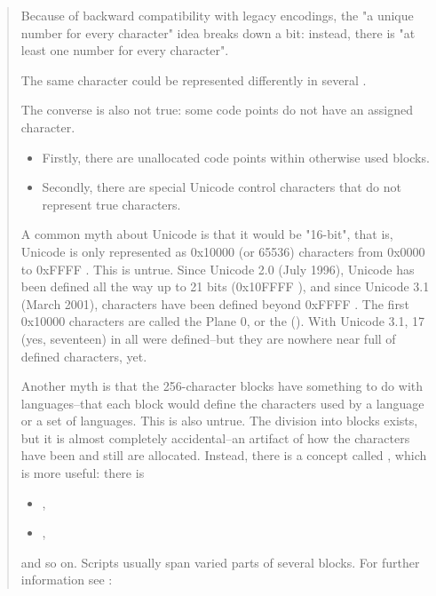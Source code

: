 \begin{htmlonly}
\begin{it}
\begin{quote}
Because of backward compatibility with legacy encodings, the "a unique
number for every character" idea breaks down a bit: instead, there is
"at least one number for every character". 

The same character could be
represented differently in several . 

The converse is also
not true: some code points do not have an assigned character. 

\begin{itemize}
\item
Firstly,
there are unallocated code points within otherwise used blocks.
\item Secondly,
there are special Unicode control characters that do not represent
true characters.
\end{itemize}

A common myth about Unicode is that it would be "16-bit", that is,
Unicode is only represented as 0x10000 (or 65536) characters from 0x0000
to 0xFFFF . This is untrue. Since Unicode 2.0 (July 1996), Unicode has
been defined all the way up to 21 bits (0x10FFFF ), and since Unicode 3.1
(March 2001), characters have been defined beyond 0xFFFF . The first
0x10000 characters are called the Plane 0, or the 
(). With Unicode 3.1, 17 (yes, seventeen)  in all were
defined--but they are nowhere near full of defined characters, yet.

Another myth is that the 256-character blocks have something to do
with languages--that each block would define the characters used by a
language or a set of languages. This is also untrue. The division into
blocks exists, but it is almost completely accidental--an artifact of
how the characters have been and still are allocated. Instead, there is
a concept called , which is more useful: there is 
\begin{itemize}
\item {},
\item {},
\end{itemize}
 and so on. Scripts usually span varied parts of several
blocks. For further information see :


\end{quote}
\end{it}
\end{htmlonly}
